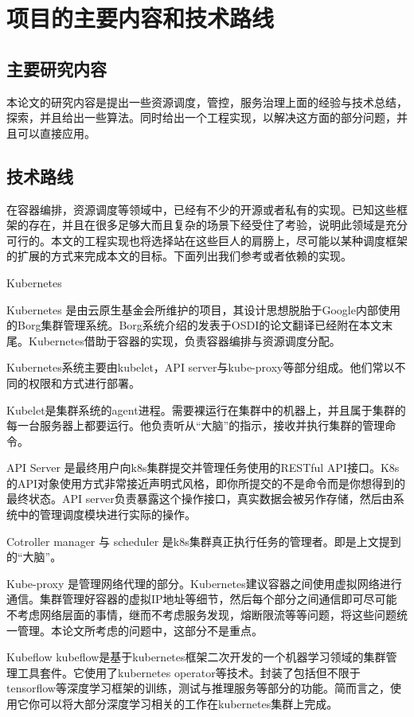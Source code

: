 \section{项目的主要内容和技术路线}

\subsection{主要研究内容}

本论文的研究内容是提出一些资源调度，管控，服务治理上面的经验与技术总结，探索，并且给出一些算法。同时给出一个工程实现，以解决这方面的部分问题，并且可以直接应用。

\subsection{技术路线}

在容器编排，资源调度等领域中，已经有不少的开源或者私有的实现。已知这些框架的存在，并且在很多足够大而且复杂的场景下经受住了考验，说明此领域是充分可行的。本文的工程实现也将选择站在这些巨人的肩膀上，尽可能以某种调度框架的扩展的方式来完成本文的目标。下面列出我们参考或者依赖的实现。

Kubernetes

Kubernetes 是由云原生基金会所维护的项目，其设计思想脱胎于Google内部使用的Borg集群管理系统。Borg系统介绍的发表于OSDI的论文翻译已经附在本文末尾。Kubernetes借助于容器的实现，负责容器编排与资源调度分配。

Kubernetes系统主要由kubelet，API server与kube-proxy等部分组成。他们常以不同的权限和方式进行部署。

Kubelet是集群系统的agent进程。需要裸运行在集群中的机器上，并且属于集群的每一台服务器上都要运行。他负责听从“大脑”的指示，接收并执行集群的管理命令。

API Server 是最终用户向k8s集群提交并管理任务使用的RESTful API接口。K8s的API对象使用方式非常接近声明式风格，即你所提交的不是命令而是你想得到的最终状态。API server负责暴露这个操作接口，真实数据会被另作存储，然后由系统中的管理调度模块进行实际的操作。

Cotroller manager 与 scheduler 是k8s集群真正执行任务的管理者。即是上文提到的“大脑”。

Kube-proxy 是管理网络代理的部分。Kubernetes建议容器之间使用虚拟网络进行通信。集群管理好容器的虚拟IP地址等细节，然后每个部分之间通信即可尽可能不考虑网络层面的事情，继而不考虑服务发现，熔断限流等等问题，将这些问题统一管理。本论文所考虑的问题中，这部分不是重点。

Kubeflow
kubeflow是基于kubernetes框架二次开发的一个机器学习领域的集群管理工具套件。它使用了kubernetes operator等技术。封装了包括但不限于tensorflow等深度学习框架的训练，测试与推理服务等部分的功能。简而言之，使用它你可以将大部分深度学习相关的工作在kubernetes集群上完成。

